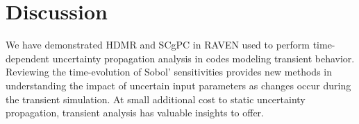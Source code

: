 \documentclass{anstrans} \usepackage{amsmath} \usepackage{amssymb}
\begin{document}
\section{Discussion}
We have demonstrated HDMR and SCgPC in RAVEN used to perform time-dependent uncertainty propagation
analysis in codes modeling transient behavior.  Reviewing the time-evolution of Sobol' sensitivities provides
new methods in understanding the impact of uncertain input parameters as changes occur during the transient
simulation.  At small additional cost to static uncertainty propagation, transient analysis has valuable
insights to offer.

\footnotesize
{}

\end{document}
